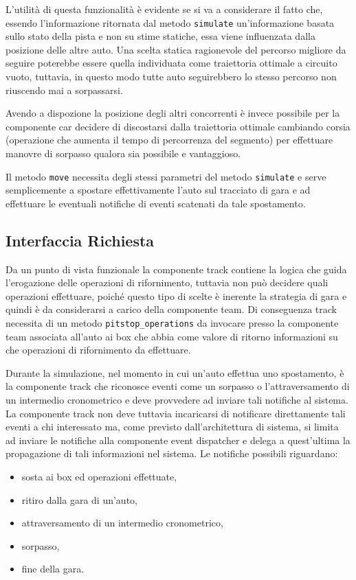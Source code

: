 \documentclass[11pt,a4paper]{report}
\newcommand{\fun}[1]{\texttt{#1}}
\begin{document}
L'utilità di questa funzionalità è evidente se si va a considerare il fatto che, essendo l'informazione ritornata dal metodo \fun{simulate} un'informazione basata sullo stato della pista e non su stime statiche, essa viene influenzata dalla posizione delle altre auto. Una scelta statica ragionevole del percorso migliore da seguire poterebbe essere quella individuata come traiettoria ottimale a circuito vuoto, tuttavia, in questo modo tutte auto seguirebbero lo stesso percorso non riuscendo mai a sorpassarsi.

Avendo a dispozione la posizione degli altri concorrenti è invece possibile per la componente car decidere di discostarsi dalla traiettoria ottimale cambiando corsia (operazione che aumenta il tempo di percorrenza del segmento) per effettuare manovre di sorpasso qualora sia possibile e vantaggioso.

Il metodo \fun{move} necessita degli stessi parametri del metodo \fun{simulate} e serve semplicemente a spostare effettivamente l'auto sul tracciato di gara e ad effettuare le eventuali notifiche di eventi scatenati da tale spostamento.
\subsection*{Interfaccia Richiesta}
Da un punto di vista funzionale la componente track contiene la logica che guida l'erogazione delle operazioni di rifornimento, tuttavia non può decidere quali operazioni effettuare, poiché questo tipo di scelte è inerente la strategia di gara e quindi è da considerarsi a carico della componente team. Di conseguenza track necessita di un metodo \fun{pitstop\_operations} da invocare presso la componente team associata all'auto ai box che abbia come valore di ritorno informazioni su che operazioni di rifornimento da effettuare.

Durante la simulazione, nel momento in cui un'auto effettua uno spostamento, è la componente track che riconosce eventi come un sorpasso o l'attraversamento di un intermedio cronometrico e deve provvedere ad inviare tali notifiche al sistema. La componente track non deve tuttavia incaricarsi di notificare direttamente tali eventi a chi interessato ma, come previsto dall'architettura di sistema, si limita ad inviare le notifiche alla componente event dispatcher e delega a quest'ultima la propagazione di tali informazioni nel sistema.
Le notifiche possibili riguardano:
\begin{itemize}
\item sosta ai box ed operazioni effettuate,
\item ritiro dalla gara di un'auto,
\item attraversamento di un intermedio cronometrico,
\item sorpasso,
\item fine della gara.
\end{itemize}
\end{document}
